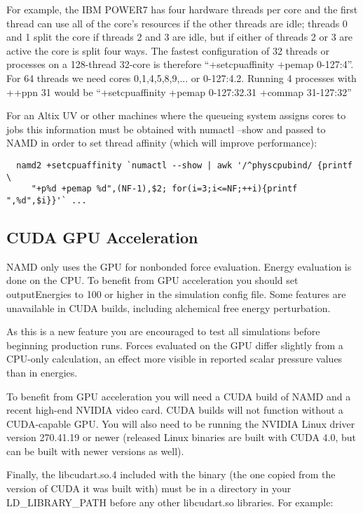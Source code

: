 For example, the IBM POWER7 has four hardware threads per core and the
first thread can use all of the core's resources if the other threads are
idle; threads 0 and 1 split the core if threads 2 and 3 are idle, but
if either of threads 2 or 3 are active the core is split four ways.  The
fastest configuration of 32 threads or processes on a 128-thread 32-core
is therefore ``+setcpuaffinity +pemap 0-127:4''.  For 64 threads we need
cores 0,1,4,5,8,9,... or 0-127:4.2.  Running 4 processes with ++ppn 31
would be ``+setcpuaffinity +pemap 0-127:32.31 +commap 31-127:32''

For an Altix UV or other machines where the queueing system assigns cores
to jobs this information must be obtained with numactl --show and passed
to NAMD in order to set thread affinity (which will improve performance):

\begin{verbatim}
  namd2 +setcpuaffinity `numactl --show | awk '/^physcpubind/ {printf \
     "+p%d +pemap %d",(NF-1),$2; for(i=3;i<=NF;++i){printf ",%d",$i}}'` ...
\end{verbatim}

\subsection{CUDA GPU Acceleration}

NAMD only uses the GPU for nonbonded force evaluation.  Energy evaluation
is done on the CPU.  To benefit from GPU acceleration you should set
outputEnergies to 100 or higher in the simulation config file.  Some
features are unavailable in CUDA builds, including alchemical free
energy perturbation.

As this is a new feature you are encouraged to test all simulations
before beginning production runs.  Forces evaluated on the GPU differ
slightly from a CPU-only calculation, an effect more visible in reported
scalar pressure values than in energies.

To benefit from GPU acceleration you will need a CUDA build of NAMD
and a recent high-end NVIDIA video card.  CUDA builds will not function
without a CUDA-capable GPU.  You will also need to be running the
NVIDIA Linux driver version 270.41.19 or newer (released Linux binaries
are built with CUDA 4.0, but can be built with newer versions as well).

Finally, the libcudart.so.4 included with the binary (the one copied from
the version of CUDA it was built with) must be in a directory in your
LD\_LIBRARY\_PATH before any other libcudart.so libraries.  For example:

